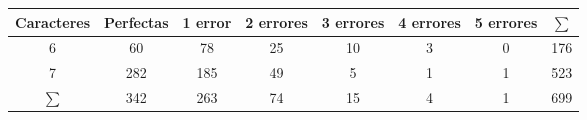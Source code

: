 \begin{tabular}{cccccccc}
    \toprule
    Caracteres & Perfectas & 1 error & 2 errores & 3 errores & 4 errores & 5 errores & $\sum$ \\
    \midrule
    6          & 60        & 78      & 25        & 10        & 3         & 0         & 176    \\
    7          & 282       & 185     & 49        & 5         & 1         & 1         & 523    \\
    $\sum$     & 342       & 263     & 74        & 15        & 4         & 1         & 699    \\
    \bottomrule
\end{tabular}
